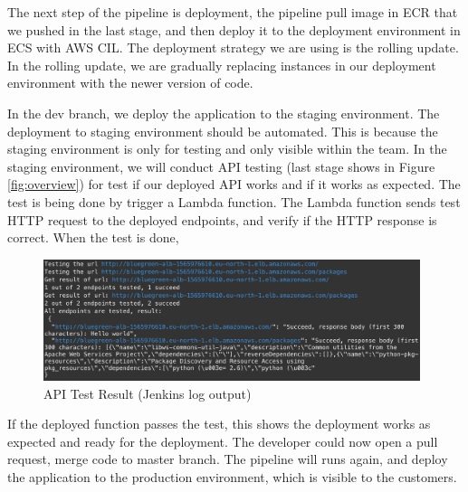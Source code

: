 \par
\label{deploy}
The next step of the pipeline is deployment, the pipeline pull image in ECR that we pushed in the last stage, and then deploy it to the deployment environment in ECS with AWS CIL. The deployment strategy we are using is the rolling update. In the rolling update, we are gradually replacing instances in our deployment environment with the newer version of code.
\par
In the dev branch, we deploy the application to the staging environment. The deployment to staging environment should be automated. This is because the staging environment is only for testing and only visible within the team. 
In the staging environment, we will conduct API testing (last stage shows in Figure \ref{fig:overview}) for test if our deployed API works and if it works as expected. The test is being done by trigger a Lambda function. The Lambda function sends test HTTP request to the deployed endpoints, and verify if the HTTP response is correct. When the test is done, 
\begin{figure}[h]
     \centering
     \includegraphics[width=0.98\textwidth]{pics/test_result.png}
     \caption{API Test Result (Jenkins log output)}
     \label{fig:test-result}
    \end{figure}
\par
If the deployed function passes the test, this shows the deployment works as expected and ready for the deployment. The developer could now open a pull request, merge code to master branch. The pipeline will runs again, and deploy the application to the production environment, which is visible to the customers.

